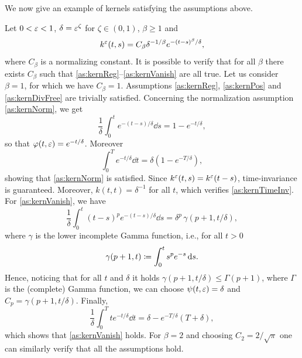 \documentclass[10pt]{article}
\begin{document}
We now give an example of kernels satisfying the assumptions above.
\begin{example}\label{ex:expKernel} Let $0<\varepsilon<1$, $\delta = \varepsilon^\zeta$ for $\zeta \in (0, 1)$, $\beta \geq 1$ and
	\begin{equation}
		k^\varepsilon(t, s) = C_{\beta} \delta^{-1/\beta} e^{-(t-s)^\beta/\delta},
	\end{equation}
	where $C_{\beta}$ is a normalizing constant. It is possible to verify that for all $\beta$ there exists $C_\beta$ such that \ref{as:kernReg}--\ref{as:kernVanish} are all true. Let us consider $\beta = 1$, for which we have $C_\beta = 1$. Assumptions \ref{as:kernReg}, \ref{as:kernPos} and \ref{as:kernDivFree} are trivially satisfied. Concerning the normalization assumption \ref{as:kernNorm}, we get
	\begin{equation}
		\frac1\delta \int_0^t  e^{-(t-s)/\delta} \dd s = 1 - e^{-t/\delta},
	\end{equation}
	so that $\varphi(t, \varepsilon) = e^{-t/\delta}$. Moreover
	\begin{equation}
		\int_0^T e^{-t / \delta} \dd t = \delta\left(1 - e^{-T/\delta}\right),
	\end{equation}
	showing that \ref{as:kernNorm} is satisfied. Since $k^\varepsilon(t, s) = k^\varepsilon(t-s)$, time-invariance is guaranteed. Moreover, $k(t, t) = \delta^{-1}$ for all $t$, which verifies \ref{as:kernTimeInv}. For \ref{as:kernVanish}, we have
	\begin{equation}
		\frac1\delta \int_0^t (t-s)^p e^{-(t-s)/\delta} \dd s = \delta^p \, \gamma(p+1,t/\delta),
	\end{equation}
	where $\gamma$ is the lower incomplete Gamma function, i.e., for all $t > 0$
	\begin{equation}
		\gamma(p+1, t) \coloneqq \int_0^t s^p e^{-s} \,\mathrm{d} s.
	\end{equation}
	Hence, noticing that for all $t$ and $\delta$ it holds $\gamma(p+1, t/\delta) \leq \Gamma(p+1)$, where $\Gamma$ is the (complete) Gamma function, we can choose $\psi(t, \varepsilon) = \delta$ and $C_p = \gamma(p+1, t/\delta)$. Finally, 
	\begin{equation}
		\frac1\delta \int_0^T t e^{-t/\delta} \dd t = \delta - e^{-T/\delta}(T + \delta),
	\end{equation}
	which shows that \ref{as:kernVanish} holds.	For $\beta = 2$ and choosing $C_2 = 2/\sqrt{\pi}$ one can similarly verify that all the assumptions hold.
\end{example}
\end{document}
